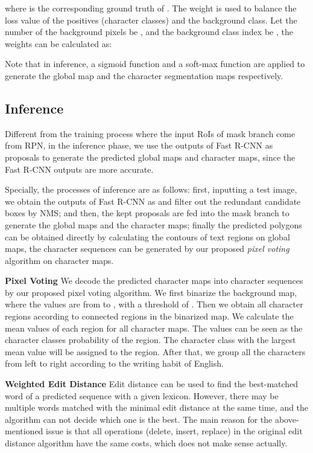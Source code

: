 \documentclass[runningheads]{llncs}
\begin{document}
where  is the corresponding ground truth of . The weight  is used to balance the loss value of the positives (character classes) and the background class. Let the number of the background pixels be , and the background class index be , the weights can be calculated as:




Note that in inference, a sigmoid function and a soft-max function are applied to generate the global map and the character segmentation maps respectively.


\subsection{Inference}

Different from the training process where the input RoIs of mask branch come from RPN, in the inference phase, we use the outputs of Fast R-CNN as proposals to generate the predicted global maps and character maps, since the Fast R-CNN outputs are more accurate. 

Specially, the processes of inference are as follows: first, inputting a test image, we obtain the outputs of Fast R-CNN as \cite{ren2015faster} and filter out the redundant candidate boxes by NMS; and then, the kept proposals are fed into the mask branch to generate the global maps and the character maps; finally the predicted polygons can be obtained directly by calculating the contours of text regions on global maps, the character sequences can be generated by our proposed \textit{pixel voting} algorithm on character maps.










\noindent\textbf{Pixel Voting} We decode the predicted character maps into character sequences by our proposed pixel voting algorithm. We first binarize the background map, where the values are from  to , with a threshold of . 
Then we obtain all character regions according to connected regions in the binarized map. We calculate the mean values of each region for all character maps. The values can be seen as the character classes probability of the region. The character class with the largest mean value will be assigned to the region. After that, we group all the characters from left to right according to the writing habit of English. 

\noindent\textbf{Weighted Edit Distance} Edit distance can be used to find the best-matched word of a predicted sequence with a given lexicon. However, there may be multiple words matched with the minimal edit distance at the same time, and the algorithm can not decide which one is the best. The main reason for the above-mentioned issue is that all operations (delete, insert, replace) in the original edit distance algorithm have the same costs, which does not make sense actually. 
\end{document}
